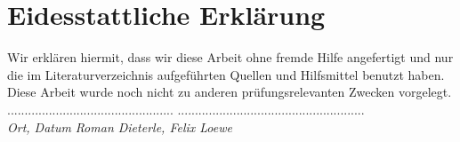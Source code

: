 \documentclass[a4paper,ngerman,oneside,titlepage,bibliography=totoc,11pt]{scrreprt}
\begin{document}
\chapter*{Eidesstattliche Erklärung}

Wir erklären hiermit, dass wir diese Arbeit ohne fremde Hilfe angefertigt und nur die im Literaturverzeichnis aufgeführten Quellen und Hilfsmittel benutzt haben. Diese Arbeit wurde noch nicht zu anderen prüfungsrelevanten Zwecken vorgelegt.\\[1.5cm]

\noindent ................................................
\qquad\qquad\qquad\qquad\qquad
......................................................\\[0.5mm]
\textit{Ort, Datum}
\qquad\qquad\qquad\qquad\qquad\qquad\qquad\qquad\qquad
\textit{Roman Dieterle, Felix Loewe}
\end{document}
